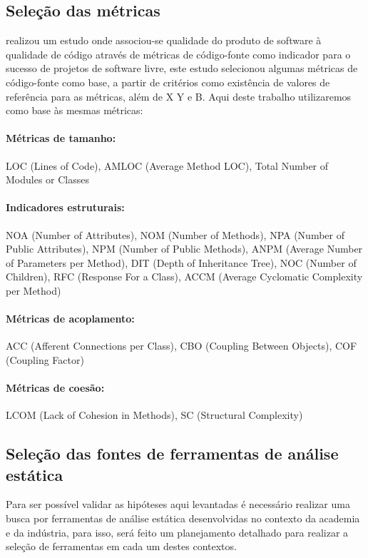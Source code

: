 \documentclass[qual, classic, a4paper]{ufbathesis}
\begin{document}
\subsection{Seleção das métricas}

 realizou um estudo onde associou-se
qualidade do produto de software à qualidade de código através de métricas de
código-fonte como indicador para o sucesso de projetos de software livre,
este estudo selecionou algumas métricas de código-fonte como base, a partir de
critérios como existência de valores de referência para as métricas, além de X
Y e B. Aqui deste trabalho utilizaremos como base às mesmas métricas:

\paragraph{Métricas de tamanho:}
LOC (Lines of Code), AMLOC (Average Method LOC), Total Number of Modules or Classes

\paragraph{Indicadores estruturais:}
NOA (Number of Attributes), NOM (Number of Methods), NPA (Number of Public
Attributes), NPM (Number of Public Methods), ANPM (Average Number of
Parameters per Method), DIT (Depth of Inheritance Tree), NOC (Number of
Children), RFC (Response For a Class), ACCM (Average Cyclomatic Complexity per
Method)

\paragraph{Métricas de acoplamento:}
ACC (Afferent Connections per Class), CBO (Coupling Between Objects), COF
(Coupling Factor)

\paragraph{Métricas de coesão:}
LCOM (Lack of Cohesion in Methods), SC (Structural Complexity)

\subsection{Seleção das fontes de ferramentas de análise estática}

Para ser possível validar as hipóteses aqui levantadas é necessário realizar
uma busca por ferramentas de análise estática desenvolvidas no contexto da
academia e da indústria, para isso, será feito um planejamento detalhado para
realizar a seleção de ferramentas em cada um destes contextos.
\end{document}
